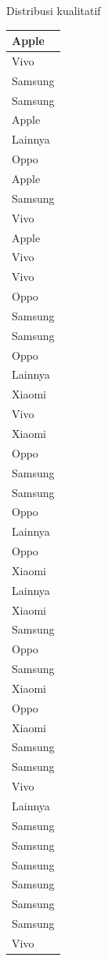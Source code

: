 \documentclass[
  ignorenonframetext,
]{beamer}
\begin{document}
\begin{frame}[s]{Distribusi kualitatif}
\begin{table}
\begin{tabular}[t]{l}
\hline
Apple\\
\hline
Vivo\\
\hline
Samsung\\
\hline
Samsung\\
\hline
Apple\\
\hline
Lainnya\\
\hline
Oppo\\
\hline
Apple\\
\hline
Samsung\\
\hline
Vivo\\
\hline
Apple\\
\hline
Vivo\\
\hline
Vivo\\
\hline
Oppo\\
\hline
Samsung\\
\hline
Samsung\\
\hline
Oppo\\
\hline
Lainnya\\
\hline
Xiaomi\\
\hline
Vivo\\
\hline
Xiaomi\\
\hline
Oppo\\
\hline
Samsung\\
\hline
Samsung\\
\hline
Oppo\\
\hline
Lainnya\\
\hline
Oppo\\
\hline
Xiaomi\\
\hline
Lainnya\\
\hline
Xiaomi\\
\hline
Samsung\\
\hline
Oppo\\
\hline
Samsung\\
\hline
Xiaomi\\
\hline
Oppo\\
\hline
Xiaomi\\
\hline
Samsung\\
\hline
Samsung\\
\hline
Vivo\\
\hline
Lainnya\\
\hline
Samsung\\
\hline
Samsung\\
\hline
Samsung\\
\hline
Samsung\\
\hline
Samsung\\
\hline
Samsung\\
\hline
Vivo\\

\end{tabular}
\end{table}
\end{frame}
\end{document}
